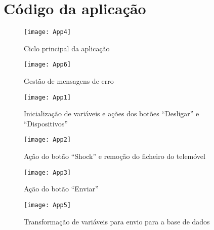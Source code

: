 \chapter{Código da aplicação}
\label{cha:codigo_da_aplicacao}

\begin{figure}[hbtp]
	\centering
	\texttt{[image: App4]}
	\caption{Ciclo principal da aplicação}
	\label{fig:App4}
\end{figure}

\begin{figure}[hbtp]
	\centering
	\texttt{[image: App6]}
	\caption{Gestão de mensagens de erro}
	\label{fig:App6}
\end{figure}

\begin{figure}[hbtp]
	\centering
	\texttt{[image: App1]}
	\caption{Inicialização de variáveis e ações dos botões ``Desligar'' e ``Dispositivos''}
	\label{fig:App1}
\end{figure}

\begin{figure}[hbtp]
	\centering
	\texttt{[image: App2]}
	\caption{Ação do botão ``Shock'' e remoção do ficheiro do telemóvel}
	\label{fig:App2}
\end{figure}

\begin{figure}[hbtp]
	\centering
	\texttt{[image: App3]}
	\caption{Ação do botão ``Enviar''}
	\label{fig:App3}
\end{figure}



\begin{figure}[hbtp]
	\centering
	\texttt{[image: App5]}
	\caption{Transformação de variáveis para envio para a base de dados}
	\label{fig:App5}
\end{figure}

